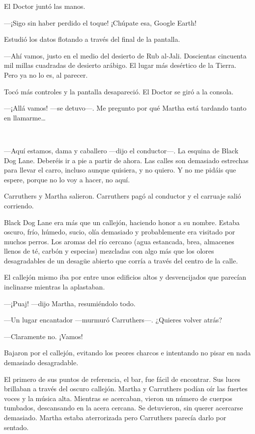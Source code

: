 El Doctor juntó las manos.

---¡Sigo sin haber perdido el toque! ¡Chúpate esa, Google Earth!

Estudió los datos flotando a través del final de la pantalla.

---Ahí vamos, justo en el medio del desierto de Rub al-Jali. Doscientas
cincuenta mil millas cuadradas de desierto arábigo. El lugar más
desértico de la Tierra. Pero ya no lo es, al parecer.

Tocó más controles y la pantalla desapareció. El Doctor se giró a la
consola.

---¡Allá vamos! ---se detuvo---. Me pregunto por qué Martha está
tardando tanto en llamarme\ldots{}

~

---Aquí estamos, dama y caballero ---dijo el conductor---. La esquina de
Black Dog Lane. Deberéis ir a pie a partir de ahora. Las calles son
demasiado estrechas para llevar el carro, incluso aunque quisiera, y no
quiero. Y no me pidáis que espere, porque no lo voy a hacer, no aquí.

Carruthers y Martha salieron. Carruthers pagó al conductor y el carruaje
salió corriendo.

Black Dog Lane era más que un callejón, haciendo honor a su nombre.
Estaba oscuro, frío, húmedo, sucio, olía demasiado y probablemente era
visitado por muchos perros. Los aromas del río cercano (agua estancada,
brea, almacenes llenos de té, carbón y especias) mezcladas con algo más
que los olores desagradables de un desagüe abierto que corría a través
del centro de la calle.

El callejón mismo iba por entre unos edificios altos y desvencijados que
parecían inclinarse mientras la aplastaban.

---¡Puaj! ---dijo Martha, resumiéndolo todo.

---Un lugar encantador ---murmuró Carruthers---. ¿Quieres volver atrás?

---Claramente no. ¡Vamos!

Bajaron por el callejón, evitando los peores charcos e intentando no
pisar en nada demasiado desagradable.

El primero de sus puntos de referencia, el bar, fue fácil de encontrar.
Sus luces brillaban a través del oscuro callejón. Martha y Carruthers
podían oír las fuertes voces y la música alta. Mientras se acercaban,
vieron un número de cuerpos tumbados, descansando en la acera cercana.
Se detuvieron, sin querer acercarse demasiado. Martha estaba
aterrorizada pero Carruthers parecía darlo por sentado.

